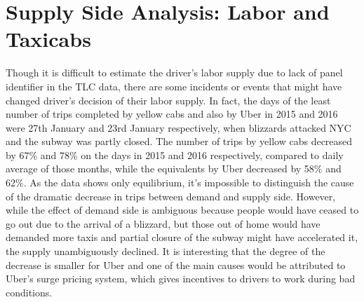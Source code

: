 \section{Supply Side Analysis: Labor and Taxicabs}
\hspace{0.5cm} Though it is difficult to estimate the driver's labor supply due to lack of panel identifier in the TLC data, there are some incidents or events that might have changed driver's decision of their labor supply. In fact, the days of the least number of trips completed by yellow cabs and also by Uber in 2015 and 2016 were 27th January and 23rd January respectively, when blizzards attacked NYC and the subway was partly closed. The number of trips by yellow cabs decreased by 67\% and 78\% on the days in 2015 and 2016 respectively, compared to daily average of those months, while the equivalents by Uber decreased by 58\% and 62\%. As the data shows only equilibrium, it's impossible to distinguish the cause of the dramatic decrease in trips between demand and supply side. However, while the effect of demand side is ambiguous because people would have ceased to go out due to the arrival of a blizzard, but those out of home would have demanded more taxis and partial closure of the subway might have accelerated it, the supply unambiguously declined. It is interesting that the degree of the decrease is smaller for Uber and one of the main causes would be attributed to Uber’s surge pricing system, which gives incentives to drivers to work during bad conditions. 

